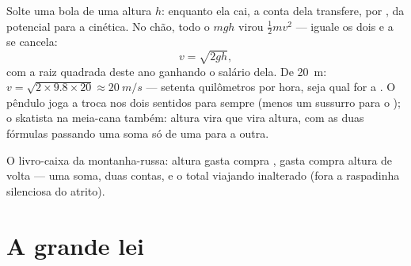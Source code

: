 \begin{example}\label{ex:g9:energy-conversions:trade}
Solte uma bola de uma altura $h$: enquanto ela cai, a conta dela
transfere,  por , da potencial para a cinética. No chão,
todo o $m g h$ virou $\frac12 m v^2$ --- iguale os dois e a  se
cancela:
\[
v = \sqrt{2 g h},
\]
com a raiz quadrada deste ano ganhando o salário dela. De
\qty{20}{m}: $v = \sqrt{2 \times 9.8 \times 20} \approx \qty{20}{m/s}$
--- setenta quilômetros por hora, seja qual for a . O pêndulo
joga a troca nos dois sentidos para sempre (menos um sussurro para o
); o skatista na meia-cana também: altura vira  que vira
altura, com as duas fórmulas passando uma soma só de uma para a
outra.
\end{example}

\begin{omfigure}

{\small O livro-caixa da montanha-russa: altura gasta compra
,  gasta compra altura de volta --- uma soma,
duas contas, e o total viajando inalterado (fora a raspadinha
silenciosa do atrito).}
\end{omfigure}

\section{A grande lei}

